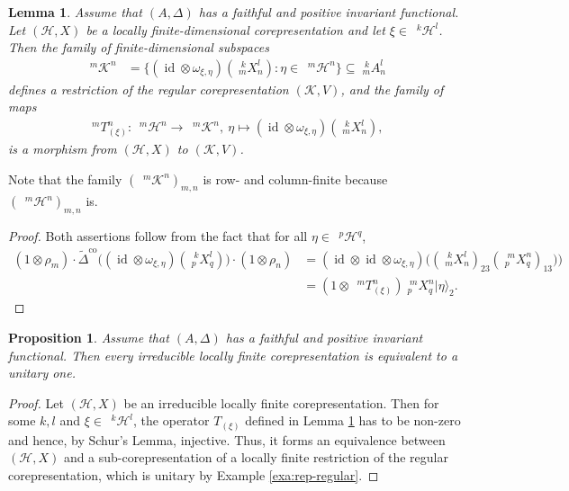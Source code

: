 \documentclass[12pt]{article}
\theoremstyle{change}
\newcommand{\co}{\mathrm{co}}
\DeclareMathOperator{\id}{id}
\newcommand{\Gr}[5]{\;{}^{\;#2}_{#4}#1_{#5}^{#3}}%
\newcommand{\Gru}[3]{\;{}^{\;#2}#1^{#3}}
\newtheorem{Lem}[Theorem]{Lemma}
\newtheorem{Prop}[Theorem]{Proposition}
\theoremstyle{definition}
\numberwithin{equation}{section}
\begin{document}
\begin{Lem} \label{lem:rep-morphism-regular}
  Assume that $(A,\Delta)$ has a faithful and positive invariant
  functional.  Let $(\mathcal{H},X)$ be a locally
  finite-dimensional corepresentation and let $\xi \in
  \Gru{\mathcal{H}}{k}{l}$. Then the family of finite-dimensional
  subspaces
  \begin{align*}
   \Gru{\mathcal{K}}{m}{n}  &=  \{ (\id \otimes
   \omega_{\xi,\eta})(\Gr{X}{k}{l}{m}{n}) : \eta \in
   \Gru{\mathcal{H}}{m} {n}\} \subseteq \Gr{A}{k}{l}{m}{n}
  \end{align*}
  defines a restriction of the regular corepresentation
  $(\mathcal{K},V)$, and the family of maps
  \begin{align*}
    \Gru{T_{(\xi)}}{m}{n} \colon \Gru{\mathcal{H}}{m}{n} \to
    \Gru{\mathcal{K}}{m}{n}, \ \eta \mapsto (\id \otimes
    \omega_{\xi,\eta})(\Gr{X}{k}{l}{m}{n}),
  \end{align*}
  is a morphism from $(\mathcal{H},X)$ to $(\mathcal{K},V)$.
\end{Lem}
Note that the family $(\Gru{\mathcal{K}}{m}{n})_{m,n}$ is row- and
column-finite because $(\Gru{\mathcal{H}}{m}{n})_{m,n}$
is. 
\begin{proof} Both assertions  follow from the fact
  that for all $\eta \in \Gru{\mathcal{H}}{p}{q}$,
\begin{align*}
  (1 \otimes \rho_{m})\cdot \tilde \Delta^{\co}\big((\id \otimes
  \omega_{\xi,\eta})(\Gr{X}{k}{l}{p}{q})\big) \cdot (1 \otimes
  \rho_{n}) &= (\id \otimes \id \otimes \omega_{\xi,\eta})\big(
  (\Gr{X}{k}{l}{m}{n})_{23}(\Gr{X}{m}{n}{p}{q})_{13})\big) \\ &=(1
  \otimes \Gru{T_{(\xi)}}{m}{n})\Gr{X}{m}{n}{p}{q} |\eta\rangle_{2}.
\end{align*}
\end{proof}
\begin{Prop}  \label{prop:rep-unitarisable}
  Assume that $(A,\Delta)$ has a faithful and positive invariant
  functional. Then every irreducible locally finite corepresentation
  is equivalent to a unitary one.
\end{Prop}
\begin{proof}
  Let $(\mathcal{H},X)$ be an irreducible locally finite
  corepresentation. Then for some $k,l$ and $\xi \in
  \Gru{\mathcal{H}}{k}{l}$,  the operator  $T_{(\xi)}$  defined in
  Lemma \ref{lem:rep-morphism-regular} has to be non-zero and hence,
  by Schur's Lemma, injective. Thus, it forms an equivalence between
  $(\mathcal{H},X)$ and a sub-corepresentation of a locally finite
  restriction of the regular corepresentation, which is unitary by
  Example \ref{exa:rep-regular}.
\end{proof}
\end{document}
